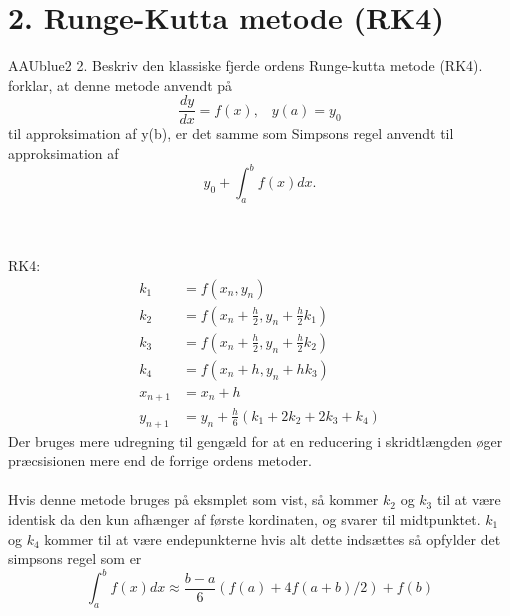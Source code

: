 \section*{2. Runge-Kutta metode (RK4)}
% 
%
\begin{color}{AAUblue2}
%
2. Beskriv den klassiske fjerde ordens Runge-kutta metode (RK4). forklar, at denne metode anvendt på
$$\frac{dy}{dx}=f(x), \phantom{...}y(a)=y_0$$
til approksimation af y(b), er det samme som Simpsons regel anvendt til approksimation af 
$$y_0+\int^b_a f(x)dx. $$
% 
\end{color}
\\\\
RK4:\\
\begin{align*}
k_1&=f(x_n,y_n)\\
k_2&=f(x_n+\frac{h}{2},y_n+\frac{h}{2}k_1)\\
k_3&=f(x_n+\frac{h}{2},y_n+\frac{h}{2}k_2)\\
k_4&=f(x_n+h,y_n+h k_3)\\
x_{n+1}&=x_n+h\\
y_{n+1}&=y_n+\frac{h}{6}(k_1+2k_2+2k_3+k_4)
\end{align*}
Der bruges mere udregning til gengæld for at en reducering i skridtlængden øger præcsisionen mere end de forrige ordens metoder.\\\\
% 
%
Hvis denne metode bruges på eksmplet som vist, så kommer $k_2$ og $k_3$ til at være identisk da den kun afhænger af første kordinaten, og svarer til midtpunktet. $k_1$ og $k_4$ kommer til at være endepunkterne hvis alt dette indsættes så opfylder det simpsons regel som er 
$$\int_a^bf(x)dx \approx \frac{b-a}{6}(f(a)+4f(a+b)/2)+f(b)$$

